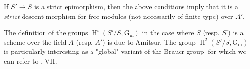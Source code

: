 If $S'\to S$ is a strict epimorphism, then the above conditions imply that it is a \emph{strict} descent morphism for free modules (not necessarily of finite type) over $A'$.

\begin{remark}\label{fga3.i-a.4.e-remark}
    The definition of the groups $\operatorname{H}^i(S'/S,\operatorname{G_m})$ in the case where $S$ (resp. $S'$) is a scheme over the field $A$ (resp. $A'$) is due to Amitsur.
    The group $\operatorname{H}^2(S'/S,\operatorname{G_m})$ is particularly interesting as a "global" variant of the Brauer group, for which we can refer to \cite{GD1960}, VII.
\end{remark}
